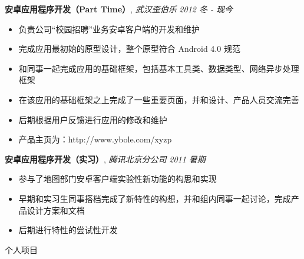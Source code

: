 \documentclass[9pt]{ctexart}
\newenvironment{changemargin}[2]{%
    \begin{list}{}{%
            \setlength{\topsep}{0pt}%
            \setlength{\leftmargin}{#1}%
            \setlength{\rightmargin}{#2}%
            \setlength{\listparindent}{\parindent}%
        \setlength{\itemindent}{\parindent}%
            \setlength{\parsep}{\parskip}%
        }%
  \item[]}{\end{list}
      }
\newcommand{\lineover}{
          \begin{changemargin}{-0.05in}{-0.05in}
              \vspace*{-8pt}
              \hrulefill \\
              \vspace*{-2pt}
          \end{changemargin}
      }
\newcommand{\header}[1]{
          \begin{changemargin}{-0.5in}{-0.5in}
              \scshape{#1}\\
              \lineover
          \end{changemargin}
      }
\newenvironment{body} {
          \vspace*{-16pt}
          \begin{changemargin}{-0.25in}{-0.5in}
          }	
      {\end{changemargin}
      }
\begin{document}
      \begin{body}
          \vspace{14pt}
          \textbf{安卓应用程序开发（Part Time）}, \emph{武汉歪伯乐} \hfill \emph{2012 冬 - 现今}\\
          \vspace*{-4pt}
      \begin{itemize} \itemsep -0pt  %
              \item 负责公司“校园招聘”业务安卓客户端的开发和维护
              \item 完成应用最初始的原型设计，整个原型符合 Android 4.0 规范
              \item 和同事一起完成应用的基础框架，包括基本工具类、数据类型、网络异步处理框架
              \item 在该应用的基础框架之上完成了一些重要页面，并和设计、产品人员交流完善
              \item 后期根据用户反馈进行应用的修改和维护
              \item 产品主页为：http://www.ybole.com/xyzp
          \end{itemize}

          \textbf {安卓应用程序开发（实习）}, \emph{腾讯北京分公司} \hfill \emph{2011 暑期}\\
          \vspace*{-4pt}
      \begin{itemize} \itemsep -0pt
              \item 参与了地图部门安卓客户端实验性新功能的构思和实现
              \item 早期和实习生同事搭档完成了新特性的构想，并和组内同事一起讨论，完成产品设计方案和文档
              \item 后期进行特性的尝试性开发
          \end{itemize}
      \end{body}

      \smallskip


      \header{个人项目}
\end{document}
